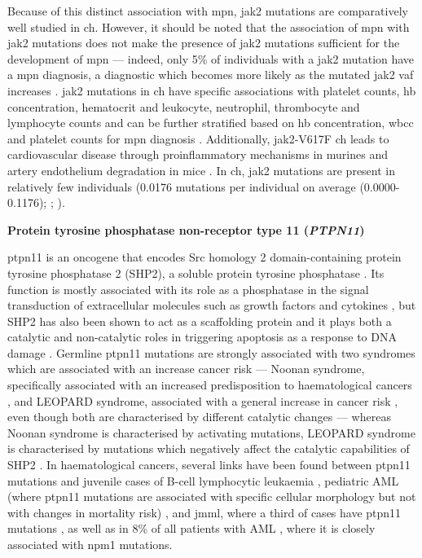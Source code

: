 Because of this distinct association with \ac{mpn}, \ac{jak2} mutations are comparatively well studied in \ac{ch}. However, it should be noted that the association of \ac{mpn} with \ac{jak2} mutations does not make the presence of \ac{jak2} mutations sufficient for the development of \ac{mpn} --- indeed, only 5\% of individuals with a \ac{jak2} mutation have a \ac{mpn} diagnosis, a diagnostic which becomes more likely as the mutated \ac{jak2} \ac{vaf} increases \cite{Cordua2019-mo}. \ac{jak2} mutations in \ac{ch} have specific associations with platelet counts, \ac{hb} concentration, hematocrit and leukocyte, neutrophil, thrombocyte and lymphocyte counts \cite{Dawoud2020-af,Cordua2019-mo} and can be further stratified based on \ac{hb} concentration, \ac{wbcc} and platelet counts for \ac{mpn} diagnosis \cite{Sochacki2019-mu,Dawoud2020-af}. Additionally, \ac{jak2}-V617F \ac{ch} leads to cardiovascular disease through proinflammatory mechanisms in murines and artery endothelium degradation in mice \cite{Sano2019-hm,Molinaro_Roberto2020-hd}. In \ac{ch}, \ac{jak2} mutations are present in relatively few individuals \cite{Jaiswal2014-rl,Genovese2014-eu,Zink2017-zi,Bolton2020-ct,Coombs2017-ph,McKerrell2015-rl,Acuna-Hidalgo2017-ng,Desai2018-pj,Young2016-du,Young2019-rz} (0.0176 mutations per individual on average (0.0000-0.1176); ; ).

\noindent \textbf{Protein tyrosine phosphatase non-receptor type 11 (\textit{PTPN11})}

\Ac{ptpn11} is an oncogene that encodes Src homology 2 domain-containing protein tyrosine phosphatase 2 (SHP2), a soluble protein tyrosine phosphatase \cite{Chan2007-xf}. Its function is mostly associated with its role as a phosphatase in the signal transduction of extracellular molecules such as growth factors and cytokines \cite{Chan2008-zh}, but SHP2 has also been shown to act as a scaffolding protein \cite{Bennett1994-wa,Li1994-xn} and it plays both a catalytic and non-catalytic roles in triggering apoptosis as a response to DNA damage \cite{Yuan2005-xt}. Germline \ac{ptpn11} mutations are strongly associated with two syndromes which are associated with an increase cancer risk --- Noonan syndrome, specifically associated with an increased predisposition to haematological cancers \cite{Tartaglia2001-ru},  and LEOPARD syndrome, associated with a general increase in cancer risk \cite{Digilio2002-nq}, even though both are characterised by different catalytic changes --- whereas Noonan syndrome is characterised by activating mutations, LEOPARD syndrome is characterised by mutations which negatively affect the catalytic capabilities of SHP2 \cite{Kontaridis2006-ia}. In haematological cancers, several links have been found between \ac{ptpn11} mutations and juvenile cases of B-cell lymphocytic leukaemia \cite{Tartaglia2004-lc}, pediatric AML (where \ac{ptpn11} mutations are associated with specific cellular morphology but not with changes in mortality risk) \cite{Loh2004-fg}, and \ac{jmml}, where a third of cases have \ac{ptpn11} mutations \cite{Tartaglia2003-xw,Kratz2005-qh}, as well as in 8\% of all patients with AML \cite{Fobare2020-et}, where it is closely associated with \ac{npm1} mutations.

